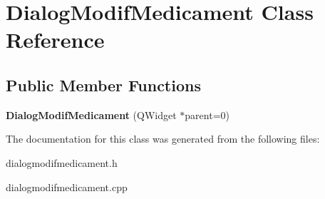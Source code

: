 \hypertarget{classDialogModifMedicament}{\section{Dialog\-Modif\-Medicament Class Reference}
\label{classDialogModifMedicament}
}
\subsection*{Public Member Functions}
\begin{DoxyCompactItemize}
\item 
\hypertarget{classDialogModifMedicament_ae00955325ab722261f6ba310fe09369c}{{\bfseries Dialog\-Modif\-Medicament} (Q\-Widget $\ast$parent=0)}\label{classDialogModifMedicament_ae00955325ab722261f6ba310fe09369c}

\end{DoxyCompactItemize}


The documentation for this class was generated from the following files\-:\begin{DoxyCompactItemize}
\item 
dialogmodifmedicament.\-h\item 
dialogmodifmedicament.\-cpp\end{DoxyCompactItemize}
